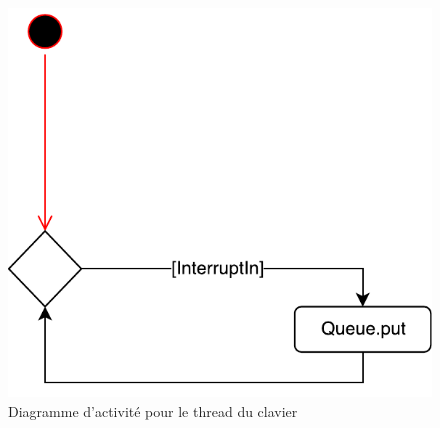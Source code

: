 \begin{figure}[hp]
	\centering
		\includegraphics[width=\textwidth]{Pictures/UML_clavier.pdf}
		\caption{Diagramme d'activité pour le thread du clavier}
		\label{fig.4}
\end{figure}